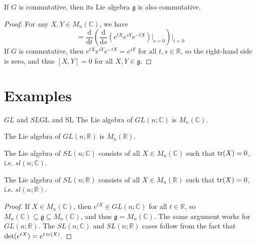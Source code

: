 \documentclass[../main.tex]{subfiles}
\begin{document}
\begin{proposition}{}{}
  If $G$ is commutative, then its Lie algebra $\mathfrak{g}$ is also commutative.
\end{proposition}
\begin{proof}
  For any $X, Y \in M_n(\mathbb{C})$, we have
  \begin{equation}
    [X, Y] = \frac{\mathrm{d}}{\mathrm{d} t} \left( \frac{\mathrm{d}}{\mathrm{d} s} (e^{tX} e^{sY} e^{-tX}) \bigg|_{s=0} \right) \bigg|_{t=0}
  \end{equation}
  If $G$ is commutative, then $e^{tX} e^{sY} e^{-tX} = e^{sY}$ for all $t, s \in \mathbb{R}$, so the right-hand side is zero, and thus $[X, Y] = 0$ for all $X, Y \in \mathfrak{g}$.
\end{proof}

\section{Examples}
\begin{proposition}{$GL$ and $SL$}{GL and SL}
  The Lie algebra of $GL(n;\mathbb{C})$ is $M_n(\mathbb{C})$.

  The Lie algebra of $GL(n;\mathbb{R})$ is $M_n(\mathbb{R})$.

  The Lie algebra of $SL(n;\mathbb{C})$ consists of all $X \in M_n(\mathbb{C})$ such that $\operatorname{tr}(X) = 0$, i.e. $sl(n;\mathbb{C})$.

  The Lie algebra of $SL(n;\mathbb{R})$ consists of all $X \in M_n(\mathbb{R})$ such that $\operatorname{tr}(X) = 0$, i.e. $sl(n;\mathbb{R})$.
\end{proposition}
\begin{proof}
  If $X \in M_n(\mathbb{C})$, then $e^{tX} \in GL(n;\mathbb{C})$ for all $t \in \mathbb{R}$, so $M_n(\mathbb{C}) \subseteq \mathfrak{g} \subseteq M_n(\mathbb{C})$, and thus $\mathfrak{g} = M_n(\mathbb{C})$. The same argument works for $GL(n;\mathbb{R})$. The $SL(n;\mathbb{C})$ and $SL(n;\mathbb{R})$ cases follow from the fact that $\det(e^{tX}) = e^{t \operatorname{tr}(X)}$.
\end{proof}
\end{document}
